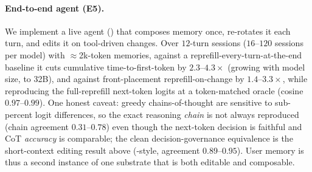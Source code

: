 \paragraph{End-to-end agent (E5).} We implement a live agent () that
composes memory once, re-rotates it each turn, and edits it on tool-driven changes. Over
$12$-turn sessions ($16$--$120$ sessions per model) with $\approx$2k-token memories, against a
reprefill-every-turn-at-the-end baseline it cuts cumulative time-to-first-token by
$2.3$--$4.3\times$ (growing with model size, to 32B), and against front-placement
reprefill-on-change by $1.4$--$3.3\times$, while reproducing the full-reprefill next-token logits at a
token-matched oracle (cosine $0.97$--$0.99$). One honest caveat: greedy chains-of-thought are
sensitive to sub-percent logit differences, so the exact reasoning \emph{chain} is not always
reproduced (chain agreement $0.31$--$0.78$) even though the next-token decision is faithful
and CoT \emph{accuracy} is comparable; the clean decision-governance equivalence is the
short-context editing result above (-style, agreement $0.89$--$0.95$). User
memory is thus a second instance of one substrate that is both editable and composable.
